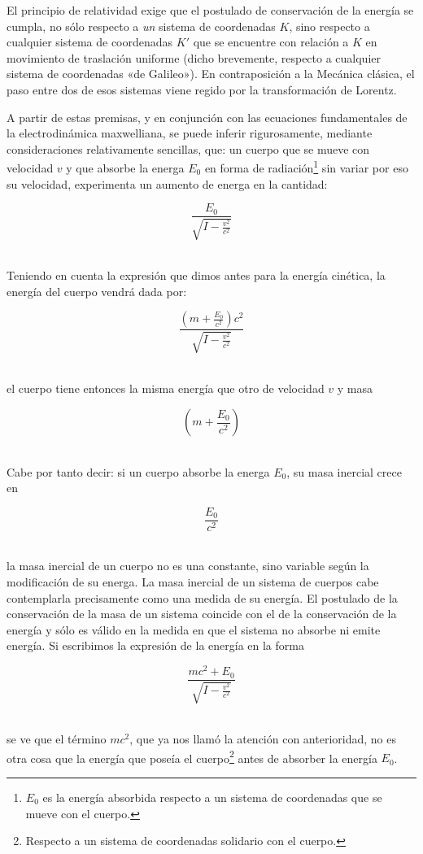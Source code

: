 \documentclass[spanish]{book}
\begin{document}
El principio de relatividad exige que el postulado de conservación de la energía se
cumpla, no sólo respecto a \textit{un} sistema de coordenadas $K$, sino respecto a cualquier
sistema de coordenadas $K'$ que se encuentre con relación a $K$ en movimiento de
traslación uniforme (dicho brevemente, respecto a cualquier sistema de coordenadas
«de Galileo»). En contraposición a la Mecánica clásica, el paso entre dos de esos
sistemas viene regido por la transformación de Lorentz.

A partir de estas premisas, y en conjunción con las ecuaciones fundamentales de la
electrodinámica maxwelliana, se puede inferir rigurosamente, mediante
consideraciones relativamente sencillas, que: un cuerpo que se mueve con velocidad $v$
y que absorbe la energa $E_{0}$ en forma de radiación\footnote{$E_{0}$ es la energía
absorbida respecto a un sistema de coordenadas que se mueve con el cuerpo.} sin variar
por eso su velocidad, experimenta un aumento de energa en la cantidad:

\[\frac{E_{0}}{\sqrt{I-\frac{v^{2}}{c^{2}}}}\]
 ~

Teniendo en cuenta la expresión que dimos antes para la energía cinética, la energía del
cuerpo vendrá dada por:

\[\frac{\left(m+\frac{E_{0}}{c^{2}}\right)c^{2}}{\sqrt{I-\frac{v^{2}}{c^{2}}}}\]
 ~

\noindent el cuerpo tiene entonces la misma energía que otro de velocidad $v$ y masa

\[\left(m+\frac{E_{0}}{c^{2}}\right)\]
 ~

\noindent Cabe por tanto decir: si un cuerpo absorbe la energa $E_{0}$, su masa inercial crece en

\[\frac{E_{0}}{c^{2}}\]
 ~

\noindent la masa inercial de un cuerpo no es una constante, sino variable según la modificación
de su energa. La masa inercial de un sistema de cuerpos cabe contemplarla precisamente
como una medida de su energía. El postulado de la conservación de la masa de un sistema
coincide con el de la conservación de la energía y sólo es válido en la medida en que el
sistema no absorbe ni emite energía. Si escribimos la expresión de la energía en la
forma


\[\frac{mc^{2}+E_{0}}{\sqrt{I-\frac{v^{2}}{c^{2}}}}\]
 ~

\noindent se ve que el término $mc^{2}$, que ya nos llamó la atención con anterioridad,
no es otra cosa que la energía que poseía el cuerpo\footnote{Respecto a un sistema de 
coordenadas solidario con el cuerpo.} antes de absorber la energía $E_{0}$.
\end{document}
